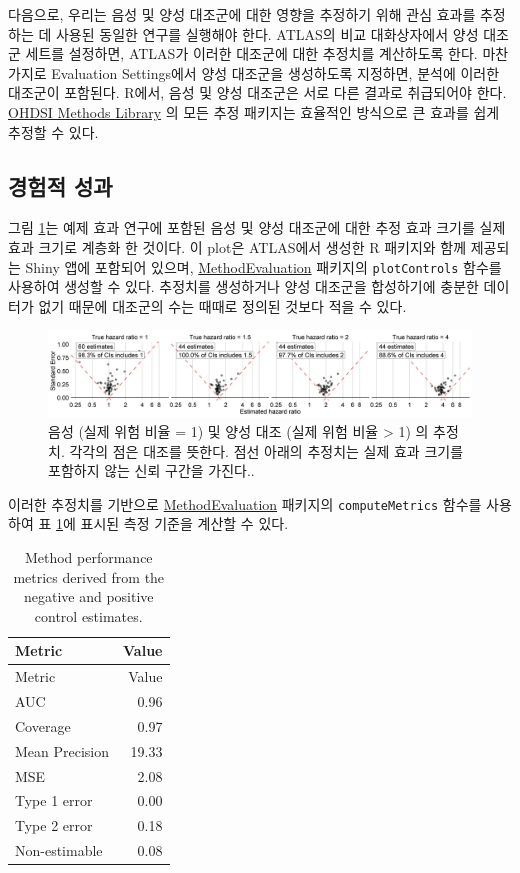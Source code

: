 \documentclass[11pt]{book}
\theoremstyle{definition}
\theoremstyle{definition}
\theoremstyle{definition}
\theoremstyle{remark}
\begin{document}
다음으로, 우리는 음성 및 양성 대조군에 대한 영향을 추정하기 위해 관심
효과를 추정하는 데 사용된 동일한 연구를 실행해야 한다. ATLAS의 비교
대화상자에서 양성 대조군 세트를 설정하면, ATLAS가 이러한 대조군에 대한
추정치를 계산하도록 한다. 마찬가지로 Evaluation Settings에서 양성
대조군을 생성하도록 지정하면, 분석에 이러한 대조군이 포함된다. R에서,
음성 및 양성 대조군은 서로 다른 결과로 취급되어야 한다.
\href{https://ohdsi.github.io/MethodsLibrary/}{OHDSI Methods Library} 의
모든 추정 패키지는 효율적인 방식으로 큰 효과를 쉽게 추정할 수 있다.

\subsection{경험적 성과}\label{-}

그림 \ref{fig:controls}는 예제 효과 연구에 포함된 음성 및 양성 대조군에
대한 추정 효과 크기를 실제 효과 크기로 계층화 한 것이다. 이 plot은
ATLAS에서 생성한 R 패키지와 함께 제공되는 Shiny 앱에 포함되어 있으며,
\href{https://ohdsi.github.io/MethodEvaluation/}{MethodEvaluation}
패키지의 \texttt{plotControls} 함수를 사용하여 생성할 수 있다. 추정치를
생성하거나 양성 대조군을 합성하기에 충분한 데이터가 없기 때문에 대조군의
수는 때때로 정의된 것보다 적을 수 있다.

\begin{figure}

{\centering \includegraphics[width=1\linewidth]{images/MethodValidity/controls} 

}

\caption{음성 (실제 위험 비율 = 1) 및 양성 대조 (실제 위험 비율 > 1) 의 추정치. 각각의 점은 대조를 뜻한다. 점선 아래의 추정치는 실제 효과 크기를 포함하지 않는 신뢰 구간을 가진다..}\label{fig:controls}
\end{figure}

이러한 추정치를 기반으로
\href{https://ohdsi.github.io/MethodEvaluation/}{MethodEvaluation}
패키지의 \texttt{computeMetrics} 함수를 사용하여 표
\ref{tab:exampleMetrics}에 표시된 측정 기준을 계산할 수 있다.

\begin{longtable}[]{@{}lr@{}}
\caption{\label{tab:exampleMetrics} Method performance metrics derived from
the negative and positive control estimates.}\tabularnewline
\toprule
Metric & Value\tabularnewline
\midrule
\endfirsthead
\toprule
Metric & Value\tabularnewline
\midrule
\endhead
AUC & 0.96\tabularnewline
Coverage & 0.97\tabularnewline
Mean Precision & 19.33\tabularnewline
MSE & 2.08\tabularnewline
Type 1 error & 0.00\tabularnewline
Type 2 error & 0.18\tabularnewline
Non-estimable & 0.08\tabularnewline
\bottomrule
\end{longtable}
\end{document}
